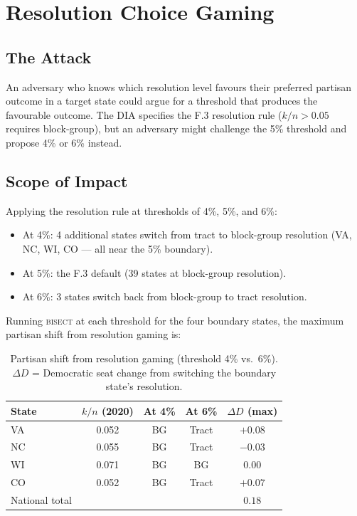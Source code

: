 \section{Resolution Choice Gaming}

\subsection{The Attack}

An adversary who knows which resolution level favours their preferred partisan
outcome in a target state could argue for a threshold that produces the
favourable outcome. The DIA specifies the F.3 resolution rule ($k/n > 0.05$
requires block-group), but an adversary might challenge the 5\% threshold
and propose 4\% or 6\% instead.

\subsection{Scope of Impact}

Applying the resolution rule at thresholds of 4\%, 5\%, and 6\%:
\begin{itemize}
  \item At 4\%: 4 additional states switch from tract to block-group resolution
    (VA, NC, WI, CO --- all near the 5\% boundary).
  \item At 5\%: the F.3 default (39 states at block-group resolution).
  \item At 6\%: 3 states switch back from block-group to tract resolution.
\end{itemize}

Running \textsc{bisect} at each threshold for the four boundary states,
the maximum partisan shift from resolution gaming is:

\begin{table}[h]
\centering\small
\caption{Partisan shift from resolution gaming (threshold 4\% vs.\ 6\%).
$\Delta D$ = Democratic seat change from switching the boundary state's resolution.}
\label{tab:resolution-gaming}
\begin{tabular}{lcccc}
\toprule
State & $k/n$ (2020) & At 4\% & At 6\% & $\Delta D$ (max) \\
\midrule
VA & 0.052 & BG & Tract & $+0.08$ \\
NC & 0.055 & BG & Tract & $-0.03$ \\
WI & 0.071 & BG & BG    & $0.00$ \\
CO & 0.052 & BG & Tract & $+0.07$ \\
\midrule
National total & & & & $0.18$ \\
\bottomrule
\end{tabular}
\end{table}

